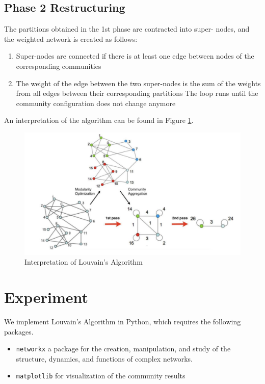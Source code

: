 \subsection{Phase 2 Restructuring}


The partitions obtained in the 1st phase are contracted into super- nodes, and the weighted network is created as follows:
\begin{enumerate}
    \item Super-nodes are connected if there is at least one edge between nodes of the corresponding communities
    \item The weight of the edge between the two super-nodes is the sum of the weights
    from all edges between their corresponding partitions The loop runs until the
    community configuration does not change anymore
\end{enumerate}

An interpretation of the algorithm can be found in Figure \ref{fig:inter}.

\begin{figure}[hb]
  \begin{center}
  \includegraphics[width=12cm]{img/louvain.png}
  \caption{Interpretation of Louvain's Algorithm}
  \label{fig:inter}
  \end{center}
\end{figure}

\section{Experiment}

We implement Louvain's Algorithm in Python, which requires the following packages.

\begin{itemize}
    \item \texttt{networkx} a package for the creation, manipulation, and study of the structure, dynamics, and functions of complex networks.
    \item \texttt{matplotlib} for visualization of the community results
\end{itemize}

